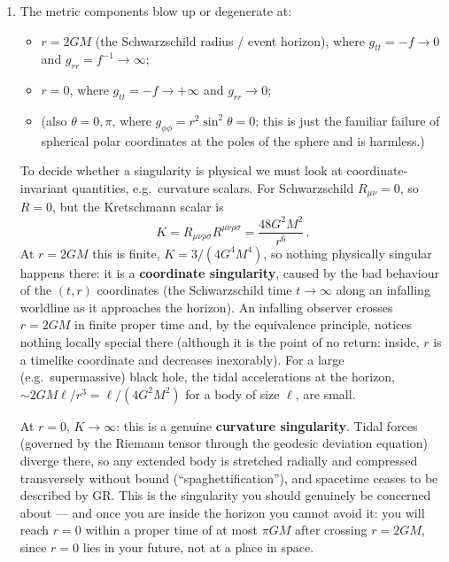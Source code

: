 \documentclass[12pt]{article}
\newcommand{\be}{\begin{equation}}
\newcommand{\ee}{\end{equation}}
\begin{document}
\begin{enumerate}[label=\alph*)]
\item The metric components blow up or degenerate at:
\begin{itemize}
\item $r = 2GM$ (the Schwarzschild radius / event horizon), where $g_{tt} = -f \to 0$ and $g_{rr} = f^{-1}\to\infty$;
\item $r = 0$, where $g_{tt} = -f\to +\infty$ and $g_{rr}\to 0$;
\item (also $\theta = 0,\pi$, where $g_{\phi\phi}=r^2\sin^2\theta = 0$; this is just the familiar failure of spherical polar
coordinates at the poles of the sphere and is harmless.)
\end{itemize}
To decide whether a singularity is physical we must look at coordinate-invariant quantities, e.g.\ curvature scalars.
For Schwarzschild $R_{\mu\nu}=0$, so $R=0$, but the Kretschmann scalar is
\be
K = R_{\mu\nu\rho\sigma}R^{\mu\nu\rho\sigma} = \frac{48 G^2 M^2}{r^6}\,.
\ee
At $r=2GM$ this is finite, $K = 3/(4G^4M^4)$, so nothing physically singular happens there: it is a
\textbf{coordinate singularity}, caused by the bad behaviour of the $(t,r)$ coordinates (the Schwarzschild time
$t\to\infty$ along an infalling worldline as it approaches the horizon). An infalling observer crosses $r=2GM$ in finite
proper time and, by the equivalence principle, notices nothing locally special there (although it is the point of no return:
inside, $r$ is a timelike coordinate and decreases inexorably). For a large (e.g.\ supermassive) black hole, the tidal
accelerations at the horizon, $\sim 2GM\ell/r^3 = \ell/(4G^2M^2)$ for a body of size $\ell$, are small.

At $r=0$, $K\to\infty$: this is a genuine \textbf{curvature singularity}. Tidal forces (governed by the Riemann tensor
through the geodesic deviation equation) diverge there, so any extended body is stretched radially and compressed
transversely without bound (``spaghettification''), and spacetime ceases to be described by GR. This is the singularity
you should genuinely be concerned about --- and once you are inside the horizon you cannot avoid it: you will reach
$r=0$ within a proper time of at most $\pi GM$ after crossing $r=2GM$, since $r=0$ lies in your future, not at a place in space.


\end{enumerate}
\end{document}

